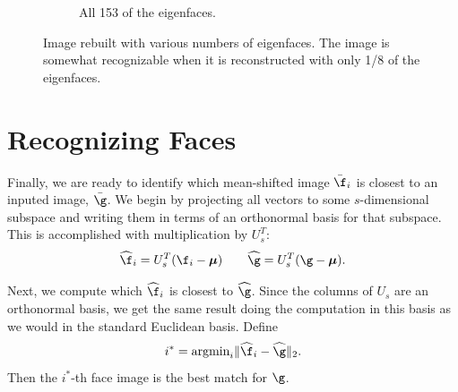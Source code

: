 \begin{figure}
\begin{subfigure}[b]{0.3\textwidth}
\caption{All 153 of the eigenfaces.}
\label{fig:all_efaces}
\end{subfigure}
\caption{Image rebuilt with various numbers of eigenfaces. The image is somewhat recognizable when it is reconstructed with only 1/8 of the eigenfaces.}
\label{fig:rebuiltImage}
\end{figure}

\section*{Recognizing Faces}
Finally, we are ready to identify which mean-shifted image $\bar{\f}_i$ is closest to an inputed image, $\bar{\g}$. 
We begin by projecting all vectors to some $s$-dimensional subspace and writing them in terms of an orthonormal basis for that subspace. 
This is accomplished with multiplication by $U_s^T$:
\[
\widehat{\f}_i = U_s^T(\f_i-{\boldsymbol \mu}) \qquad \widehat{\g} = U_s^T(\g-{\boldsymbol \mu}).
\]

Next, we compute which $\widehat{\f}_i$ is closest to $\widehat{\g}$. 
Since the columns of $U_s$ are an orthonormal basis, we get the same result doing the computation in this basis as we would in the standard Euclidean basis.
Define
\[
i^* = \text{argmin}_i \|\widehat{\f}_i - \widehat{\g}\|_2.
\]
Then the $i^*$-th face image is the best match for $\g$.


